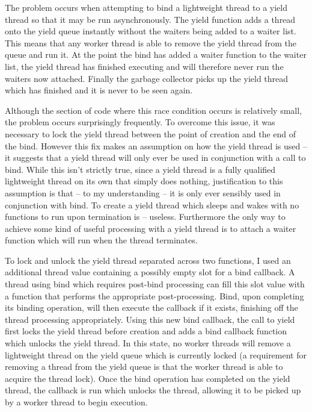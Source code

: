 \documentclass[12pt,twoside,notitlepage]{report}
\begin{document}
The problem occurs when attempting to bind a lightweight thread to a yield thread so that it may be run asynchronously. The yield function adds a thread onto the yield queue instantly without the waiters being added to a waiter list. This means
that any worker thread is able to remove the yield thread from the queue and run it. At the point the bind has added a waiter function to the waiter list, the yield thread has finished executing and will therefore never run the
waiters now attached. Finally the garbage collector picks up the yield thread which has finished and it is never to be seen again. 

%
%
Although the section of code where this race condition occurs is relatively small, the problem occurs surprisingly frequently. To overcome this issue, it was necessary to lock the yield thread between the point of creation
and the end of the bind. However this fix makes an assumption on how the yield thread is used -- it suggests that a yield thread will only ever be used in conjunction with a call to bind. While this isn't strictly true, since a yield
thread is a fully qualified lightweight thread on its own that simply does nothing, justification to this assumption is that -- to my understanding -- it is only ever sensibly used in conjunction with bind. To create a yield thread which sleeps
and wakes with no functions to run upon termination is -- useless. Furthermore the only way to achieve some kind of useful processing with a yield thread is to attach a waiter function which will run when the thread terminates.

To lock and unlock the yield thread separated across two functions, I used an additional thread value containing a possibly empty slot for a bind callback. A thread using bind which requires post-bind processing can fill this slot value with
a function that performs the appropriate post-processing. Bind, upon completing its binding operation, will then execute the callback if it exists, finishing off the thread processing appropriately. Using this new bind callback, the
call to yield first locks the yield thread before creation and adds a bind callback function which unlocks the yield thread. In this state, no worker threads will remove a lightweight thread on the yield queue which is currently locked (a requirement
for removing a thread from the yield queue is that the worker thread is able to acquire the thread lock). Once the bind operation has completed on the yield thread, the callback is run which unlocks the thread, allowing it to be
picked up by a worker thread to begin execution.
\end{document}
